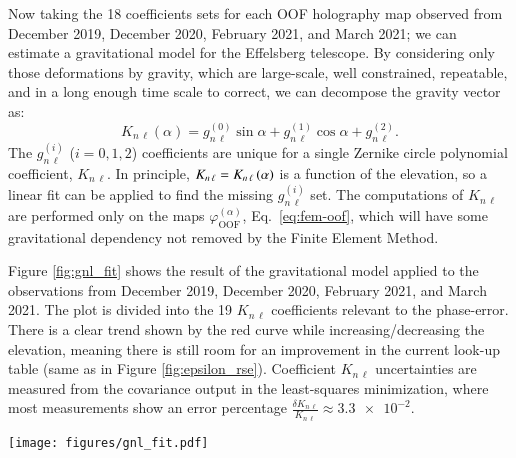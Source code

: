 \documentclass[
    ]
    {aa}
\begin{document}
    Now taking the 18 coefficients sets for each OOF holography map observed from December 2019, December 2020, February 2021, and March 2021; we can estimate a gravitational model \citep{2007A&A...465..685N} for the Effelsberg telescope. By considering only those deformations by gravity, which are large-scale, well constrained, repeatable, and in a long enough time scale to correct, we can decompose the gravity vector as:
    \begin{equation}
        K_{n\,\ell}(\alpha) = g_{n\,\ell}^{(0)} \sin\alpha + g_{n\,\ell}^{(1)}\cos\alpha + g_{n\,\ell}^{(2)}.
        \label{eq:gravity}
    \end{equation}
    The $g_{n\,\ell}^{(i)}$ ($i=0, 1, 2$) coefficients are unique for a single Zernike circle polynomial coefficient, $K_{n\,\ell}$. In principle, $K_{n\,\ell}=K_{n\,\ell}\del{\alpha}$ is a function of the elevation, so a linear fit can be applied to find the missing $g_{n\,\ell}^{(i)}$ set. The computations of $K_{n\,\ell}$ are performed only on the maps $\varphi^{(\alpha)}_\text{OOF}$, Eq.~\eqref{eq:fem-oof}, which will have some gravitational dependency not removed by the Finite Element Method.

    Figure \ref{fig:gnl_fit} shows the result of the gravitational model applied to the observations from December 2019, December 2020, February 2021, and March 2021. The plot is divided into the \num{19} $K_{n\,\ell}$ coefficients relevant to the phase-error. There is a clear trend shown by the red curve while increasing/decreasing the elevation, meaning there is still room for an improvement in the current look-up table (same as in Figure \ref{fig:epsilon_rse}). Coefficient $K_{n\,\ell}$ uncertainties are measured from the covariance output in the least-squares minimization, where most measurements show an error percentage $\frac{\delta K_{n\,\ell}}{K_{n\,\ell}}\approx\num{3.3e-2}$.

    \begin{figure*}[t]
        \centering
        \texttt{[image: figures/gnl\_fit.pdf]}
        \caption{Gravitational model in terms of Zernike circle polynomial coefficients. The squares, triangles, circles, and diamond represent OOF holography observations from December 2019, December 2020,  February 2021, and March 2021; respectively. The red line is the best fit made to the data using Eq.~\eqref{eq:gravity} with three $g_{n\,\ell}^{(i)}$ coefficients. A flat model indicates that no corrections are needed to the $K_{n\,\ell}$ coefficient.}
        \label{fig:gnl_fit}
    \end{figure*}
\end{document}
